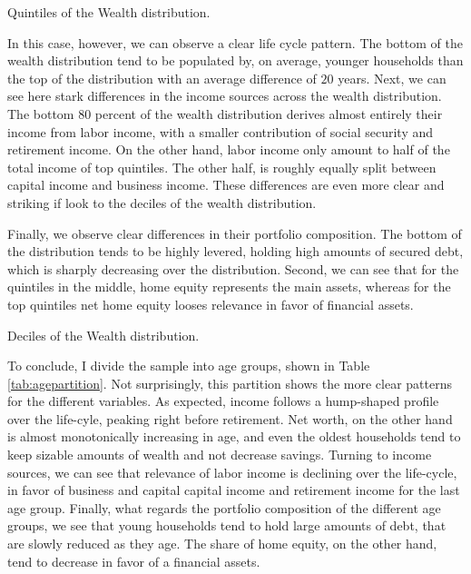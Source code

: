 \documentclass[11pt, a4paper, leqno]{article}
\begin{document}
\begin{table}[h]
    \caption{Quintiles of the Wealth distribution.}
    \resizebox{\textwidth}{!}{}
    \label{tab:quintilesnetworth}
\end{table}

In this case, however, we can observe a clear life cycle pattern. The bottom of the wealth distribution tend to be populated by, on average, younger households than the top of the distribution with an average difference of $20$ years. Next, we can see here stark differences in the income sources across the wealth distribution. The bottom $80$ percent of the wealth distribution derives almost entirely their income from labor income, with a smaller contribution of social security and retirement income. On the other hand, labor income only amount to half of the total income of top quintiles. The other half, is roughly equally split between capital income and business income. These differences are even more clear and striking if look to the deciles of the wealth distribution.

Finally, we observe clear differences in their portfolio composition. The bottom of the distribution tends to be highly levered, holding high amounts of secured debt, which is sharply decreasing over the distribution. Second, we can see that for the quintiles in the middle, home equity represents the main assets, whereas for the top quintiles net home equity looses relevance in favor of financial assets.

\begin{table}[h]
    \caption{Deciles of the Wealth distribution.}
    \resizebox{\textwidth}{!}{}
    \label{tab:decilesnetworth}
\end{table}

To conclude, I divide the sample into age groups, shown in Table \ref*{tab:agepartition}. Not surprisingly, this partition shows the more clear patterns for the different variables. As expected, income follows a hump-shaped profile over the life-cyle, peaking right before retirement. Net worth, on the other hand is almost monotonically increasing in age, and even the oldest households tend to keep sizable amounts of wealth and not decrease savings. Turning to income sources, we can see that relevance of labor income is declining over the life-cycle, in favor of business and capital capital income and retirement income for the last age group. Finally, what regards the portfolio composition of the different age groups, we see that young households tend to hold large amounts of debt, that are slowly reduced as they age. The share of home equity, on the other hand, tend to decrease in favor of a financial assets.
\end{document}
